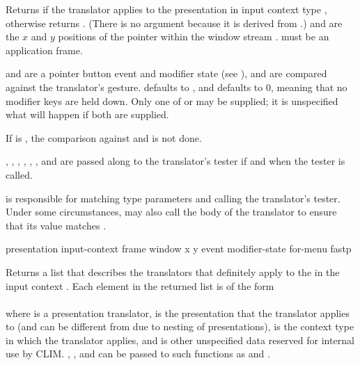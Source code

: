 Returns  if the translator  applies to the
presentation  in input context type ,
otherwise returns .  (There is no  argument because
it is derived from .)   and  are the $x$ and $y$
positions of the pointer within the window stream .
 must be an application frame.

 and  are a pointer button event and modifier
state (see ), and are compared against the
translator's gesture.   defaults to , and
 defaults to 0, meaning that no modifier keys are held down.
Only one of  or  may be supplied; it is
unspecified what will happen if both are supplied.

If  is , the comparison against  and
 is not done.

, , , , ,
, and  are passed along to the translator's tester if and
when the tester is called.

 is responsible for matching type parameters
and calling the translator's tester.  Under some circumstances,
 may also call the body of the translator to
ensure that its value matches .


 {presentation input-context frame window x y
                                      \key event modifier-state for-menu fastp}

Returns a list that describes the translators that definitely apply to the
  in the input context .
Each element in the returned list is of the form
\\
\\
where  is a presentation translator,  is
the presentation that the translator applies to (and can be different from
 due to nesting of presentations),  is the
context type in which the translator applies, and  is other
unspecified data reserved for internal use by CLIM.  ,
, and  can be passed to such functions
as  and .

